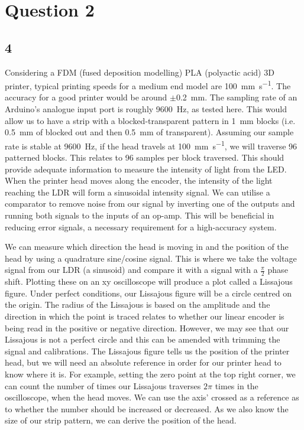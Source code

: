 \documentclass[conference]{IEEEtran}
\begin{document}
\section{Question 2}
\subsection{4}
Considering a FDM (fused deposition modelling) PLA (polyactic acid) 3D printer, typical printing speeds \cite{b1} for a medium end model are \SI{100}{\milli\meter\per\second}. The accuracy for a good printer would be around $\pm$\SI{0.2}{\milli\meter}. The sampling rate of an Arduino's analogue input port is roughly \SI{9600}{\hertz}, as tested here. This would allow us to have a strip with a blocked-transparent pattern in \SI{1}{\milli\meter} blocks (i.e. \SI{0.5}{\milli\meter} of blocked out and then \SI{0.5}{\milli\meter} of transparent). Assuming our sample rate is stable at \SI{9600}{\hertz}, if the head travels at \SI{100}{\milli\meter\per\second}, we will traverse 96 patterned blocks. This relates to 96 samples per block traversed. This should provide adequate information to measure the intensity of light from the LED. When the printer head moves along the encoder, the intensity of the light reaching the LDR will form a sinusoidal intensity signal. We can utilise a comparator to remove noise from our signal by inverting one of the outputs and running both signals to the inputs of an op-amp. This will be beneficial in reducing error signals, a necessary requirement for a high-accuracy system. 

We can measure which direction the head is moving in and the position of the head by using a quadrature sine/cosine signal. This is where we take the voltage signal from our LDR (a sinusoid) and compare it with a signal with a $\frac{\pi}{2}$ phase shift. Plotting these on an xy oscilloscope will produce a plot called a Lissajous figure. Under perfect conditions, our Lissajous figure will be a circle centred on the origin. The radius of the Lissajous is based on the amplitude and the direction in which the point is traced relates to whether our linear encoder is being read in the positive or negative direction. However, we may see that our Lissajous is not a perfect circle and this can be amended with trimming the signal and calibrations. The Lissajous figure tells us the position of the printer head, but we will need an absolute reference in order for our printer head to know where it is. For example, setting the zero point at the top right corner, we can count the number of times our Lissajous traverses $2\pi$ times in the oscilloscope, when the head moves. We can use the axis' crossed as a reference as to whether the number should be increased or decreased. As we also know the size of our strip pattern, we can derive the position of the head.
\end{document}
